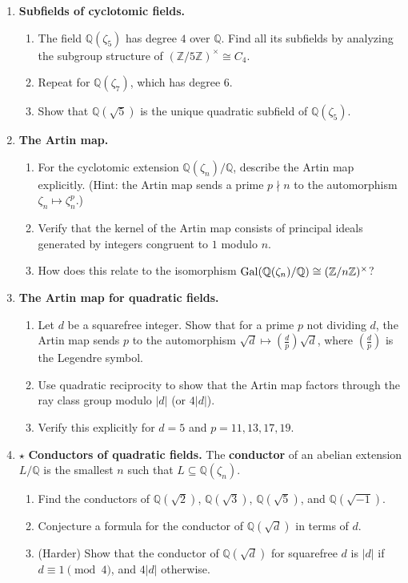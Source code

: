 \begin{enumerate}
    \item \textbf{Subfields of cyclotomic fields.}
    \begin{enumerate}
        \item The field $\mathbb{Q}(\zeta_5)$ has degree $4$ over $\mathbb{Q}$. Find all its subfields by analyzing the subgroup structure of $(\mathbb{Z}/5\mathbb{Z})^\times \cong C_4$.
        \item Repeat for $\mathbb{Q}(\zeta_7)$, which has degree $6$.
        \item Show that $\mathbb{Q}(\sqrt{5})$ is the unique quadratic subfield of $\mathbb{Q}(\zeta_5)$.
    \end{enumerate}

    \item \textbf{The Artin map.}
    \begin{enumerate}
        \item For the cyclotomic extension $\mathbb{Q}(\zeta_n)/\mathbb{Q}$, describe the Artin map explicitly. (Hint: the Artin map sends a prime $p \nmid n$ to the automorphism $\zeta_n \mapsto \zeta_n^p$.)
        \item Verify that the kernel of the Artin map consists of principal ideals generated by integers congruent to $1$ modulo $n$.
        \item How does this relate to the isomorphism $\operatorname{Gal}(\mathbb{Q}(\zeta_n)/\mathbb{Q}) \cong (\mathbb{Z}/n\mathbb{Z})^\times$?
    \end{enumerate}

    \item \textbf{The Artin map for quadratic fields.}
    \begin{enumerate}
        \item Let $d$ be a squarefree integer. Show that for a prime $p$ not dividing $d$, the Artin map sends $p$ to the automorphism $\sqrt{d} \mapsto \left(\frac{d}{p}\right)\sqrt{d}$, where $\left(\frac{d}{p}\right)$ is the Legendre symbol.
        \item Use quadratic reciprocity to show that the Artin map factors through the ray class group modulo $|d|$ (or $4|d|$).
        \item Verify this explicitly for $d = 5$ and $p = 11, 13, 17, 19$.
    \end{enumerate}

    \item $\star$ \textbf{Conductors of quadratic fields.}
    The \textbf{conductor} of an abelian extension $L/\mathbb{Q}$ is the smallest $n$ such that $L \subseteq \mathbb{Q}(\zeta_n)$.
    \begin{enumerate}
        \item Find the conductors of $\mathbb{Q}(\sqrt{2})$, $\mathbb{Q}(\sqrt{3})$, $\mathbb{Q}(\sqrt{5})$, and $\mathbb{Q}(\sqrt{-1})$.
        \item Conjecture a formula for the conductor of $\mathbb{Q}(\sqrt{d})$ in terms of $d$.
        \item (Harder) Show that the conductor of $\mathbb{Q}(\sqrt{d})$ for squarefree $d$ is $|d|$ if $d \equiv 1 \pmod{4}$, and $4|d|$ otherwise.
    \end{enumerate}


\end{enumerate}
